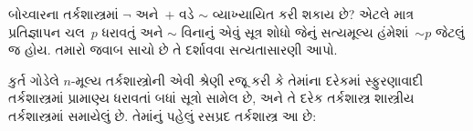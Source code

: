 \begin{prob}
  બોચ્વારના તર્કશાસ્ત્રમાં $\lnot$ અને~$+$ વડે $\sim$ વ્યાખ્યાયિત
  કરી શકાય છે? એટલે માત્ર પ્રતિજ્ઞાપન ચલ~$p$ ધરાવતું અને $\sim$ વિનાનું એવું સૂત્ર
  શોધો જેનું સત્યમૂલ્ય હંમેશાં~$\mathord{\sim}p$ જેટલું જ હોય.
  તમારો જવાબ સાચો છે તે દર્શાવવા સત્યતાસારણી આપો.
\end{prob}
\endgroup


\begingroup
\makeatletter{}\makeatother


\label{guunit:OLP-0396}


કુર્ત ગોડેલે $n$-મૂલ્ય તર્કશાસ્ત્રોની એવી શ્રેણી રજૂ કરી કે
તેમાંના દરેકમાં સ્ફુરણાવાદી તર્કશાસ્ત્રમાં પ્રામાણ્ય ધરાવતાં બધાં
સૂત્રો સામેલ છે, અને તે દરેક તર્કશાસ્ત્ર શાસ્ત્રીય
તર્કશાસ્ત્રમાં સમાયેલું છે.
તેમાંનું પહેલું રસપ્રદ તર્કશાસ્ત્ર આ છે:

